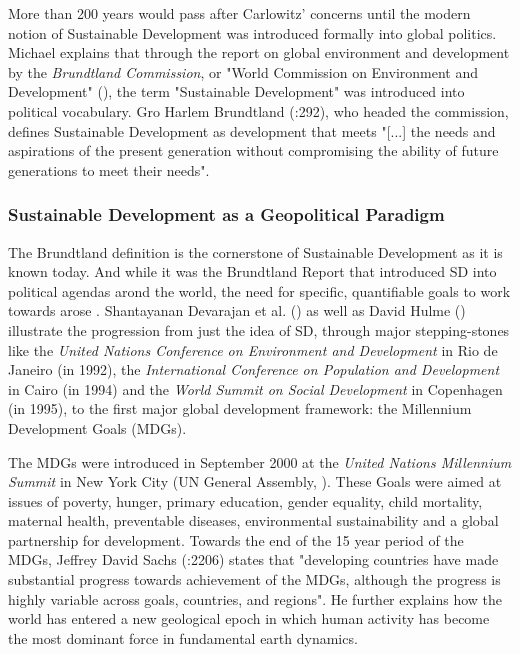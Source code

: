 		        More than 200 years would pass after Carlowitz' concerns until the modern notion of Sustainable Development was introduced formally into global politics. Michael \citet{redclift2005} explains that through the report on global environment and development by the \textit{Brundtland Commission}, or "World Commission on Environment and Development" (\citeyear{wced1987}), the term "Sustainable Development" was introduced into political vocabulary. Gro Harlem Brundtland (\citeyear{brundtland1987}:292),  who headed the commission, defines Sustainable Development as development that meets "[...] the needs and aspirations of the present generation without compromising the ability of future generations to meet their needs".
		        
		        
		    
		    \subsubsection{Sustainable Development as a Geopolitical Paradigm}
		        The Brundtland definition is the cornerstone of Sustainable Development as it is known today. And while it was the Brundtland Report that introduced SD into political agendas arond the world, the need for specific, quantifiable goals to work towards arose \citep{dupisani2006}. Shantayanan Devarajan et al. (\citeyear{devarajan2002}) as well as David Hulme (\citeyear{hulme2009}) illustrate the progression from just the idea of SD, through major stepping-stones like the \textit{United Nations Conference on Environment and Development} in Rio de Janeiro (in 1992), the \textit{International Conference on Population and Development} in Cairo (in 1994) and the \textit{World Summit on Social Development} in Copenhagen (in 1995), to the first major global development framework: the Millennium Development Goals (MDGs).
		        
		        \medskip
		        
		        The MDGs were introduced in September 2000 at the \textit{United Nations Millennium Summit} in New York City (UN General Assembly, \citeyear{ungeneralassembly2000}). These Goals were aimed at issues of poverty, hunger, primary education, gender equality, child mortality, maternal health, preventable diseases, environmental sustainability and a global partnership for development. Towards the end of the 15 year period of the MDGs, Jeffrey David Sachs (\citeyear{sachs2012}:2206) states that "developing countries have made substantial progress towards achievement of the MDGs, although the progress is highly variable across goals, countries, and regions". He further explains how the world has entered a new geological epoch in which human activity has become the most dominant force in fundamental earth dynamics. 
		        
